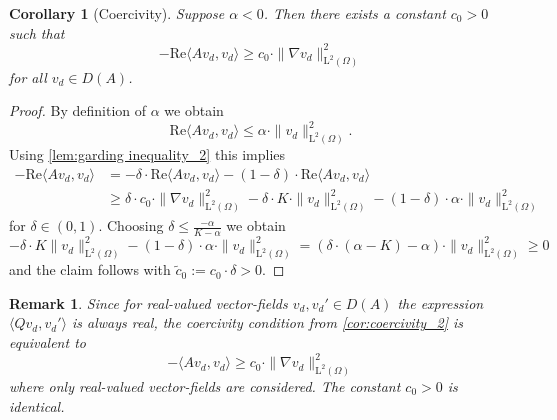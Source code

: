 \documentclass[preprint]{elsarticle}
\newtheorem{cor}[cor]{Corollary}
\newtheorem{rem}[rem]{Remark}
\numberwithin{equation}{section}
\renewcommand{\Re}{\mathrm{Re}}
\newcommand{\rL}{\mathrm{L}}
\begin{document}
\begin{cor}[Coercivity]\label{cor:coercivity_2}
	Suppose $\alpha < 0$. Then there exists a constant $c_0>0$ such that
	\begin{equation*}
		- \Re \langle A v_d, v_d \rangle 
		\geq c_0 \cdot 
		\| \nabla v_d \|_{\rL^2(\Omega)}^2 
	\end{equation*}
	for all $v_d \in D(A)$.
\end{cor}
\begin{proof}
	By definition of $\alpha$ we obtain
	\begin{equation*}
		\Re \langle Av_d , v_d \rangle \leq \alpha \cdot \| v_d \|_{\rL^2(\Omega)}^2 . 
	\end{equation*}
	Using \autoref{lem:garding inequality_2} this implies
	\begin{align*}
		- \Re \langle A v_d, v_d \rangle 
		&= - \delta \cdot \Re \langle A v_d, v_d \rangle 
		- (1-\delta) \cdot \Re \langle A v_d, v_d \rangle \\
		&\geq \delta \cdot  c_0 \cdot \| \nabla v_d \|_{\rL^2(\Omega)}^2 - \delta \cdot K \cdot \| v_d \|_{\rL^2(\Omega)}^2 - (1-\delta) \cdot \alpha \cdot 
		\| v_d \|_{\rL^2(\Omega)}^2 
	\end{align*}
	for $\delta \in (0,1)$. Choosing $\delta \leq \frac{-\alpha}{K-\alpha}$ we obtain 
	\begin{equation*}
		- \delta \cdot K \| v_d \|_{\rL^2(\Omega)}^2 
		- (1-\delta) \cdot \alpha \cdot 
		\| v_d \|_{\rL^2(\Omega)}^2 
		= ( \delta \cdot (\alpha-K) - \alpha  ) \cdot \| v_d \|_{\rL^2(\Omega)}^2 
		\geq 0 
	\end{equation*}
	and the claim follows with $\tilde{c}_0 := c_0 \cdot \delta > 0$. 
\end{proof}

\begin{rem}
	Since for real-valued vector-fields $v_d,v_d' \in D(A)$ the expression $\langle Q v_d,v_d' \rangle$ is always real, the coercivity condition from \autoref{cor:coercivity_2}
	is equivalent to 
	\begin{equation*}
		- \langle A v_d, v_d \rangle 
		\geq c_0 \cdot 
		\| \nabla v_d \|_{\rL^2(\Omega)}^2 
	\end{equation*} 
	where only real-valued vector-fields are considered. The constant $c_0>0$ is identical. 
\end{rem}
\end{document}
